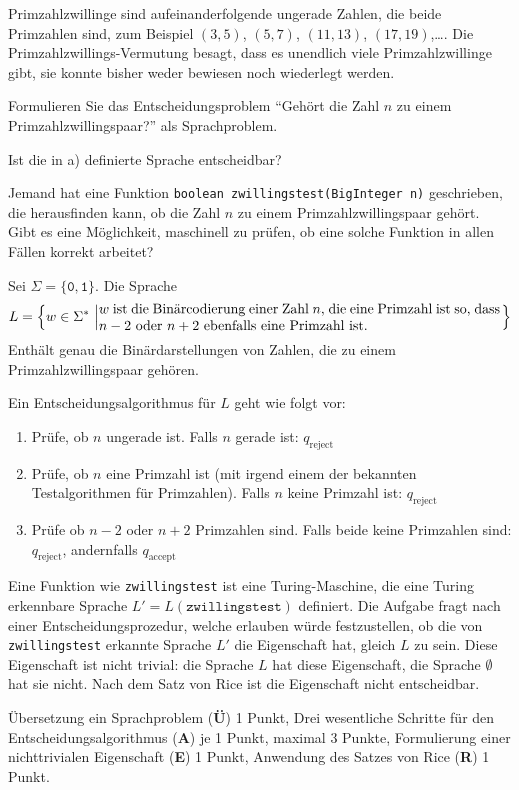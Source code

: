 Primzahlzwillinge sind aufeinanderfolgende ungerade Zahlen, die beide
Primzahlen sind, zum Beispiel $(3,5)$, $(5,7)$, $(11,13)$, $(17,19)$,\dots.
Die Primzahlzwillings-Vermutung besagt, dass es unendlich viele
Primzahlzwillinge gibt, sie konnte bisher weder bewiesen noch wiederlegt
werden.


\begin{teilaufgaben}
\item Formulieren Sie das Entscheidungsproblem ``Gehört die Zahl $n$ zu
einem Primzahlzwillingspaar?'' als Sprachproblem.
\item Ist die in a) definierte Sprache entscheidbar?
\item Jemand hat eine Funktion \texttt{boolean zwillingstest(BigInteger n)}
geschrieben, die herausfinden kann, ob die Zahl $n$ zu einem
Primzahlzwillingspaar gehört.
Gibt es eine Möglichkeit, maschinell zu prüfen, ob eine solche Funktion
in allen Fällen korrekt arbeitet?
\end{teilaufgaben}

\begin{loesung}
\begin{teilaufgaben}
\item Sei $\Sigma=\{\texttt{0},\texttt{1}\}$. Die Sprache
\[
L=\left\{w\in\Sigma^*\,\left|
\begin{minipage}{4truein}
$w$ ist die Binärcodierung einer Zahl $n$, die eine Primzahl ist
so, dass $n-2$ oder $n+2$ ebenfalls eine Primzahl ist.
\end{minipage}
\right.
\right\}
\]
Enthält genau die Binärdarstellungen von Zahlen, die zu einem
Primzahlzwillingspaar gehören.
\item
Ein Entscheidungsalgorithmus für $L$ geht wie folgt vor:
\begin{enumerate}
\item Prüfe, ob $n$ ungerade ist. Falls $n$ gerade ist: $q_\text{reject}$
\item Prüfe, ob $n$ eine Primzahl ist (mit irgend einem der bekannten
Testalgorithmen für Primzahlen). Falls $n$ keine Primzahl ist:
$q_{\text{reject}}$
\item Prüfe ob $n-2$ oder $n+2$ Primzahlen sind. Falls beide keine
Primzahlen sind: $q_{\text{reject}}$, andernfalls $q_{\text{accept}}$
\end{enumerate}
\item
Eine Funktion wie \texttt{zwillingstest} ist eine Turing-Maschine, die
eine Turing erkennbare Sprache $L'=L(\texttt{zwillingstest})$ definiert.
Die Aufgabe fragt nach einer Entscheidungsprozedur, welche erlauben
würde festzustellen, ob die von \texttt{zwillingstest} erkannte
Sprache $L'$ die Eigenschaft hat, gleich $L$ zu sein. Diese
Eigenschaft ist nicht trivial: die Sprache $L$ hat diese Eigenschaft,
die Sprache $\emptyset$ hat sie nicht. Nach dem Satz von Rice ist
die Eigenschaft nicht entscheidbar.
\qedhere
\end{teilaufgaben}
\end{loesung}

\begin{bewertung}
Übersetzung ein Sprachproblem ({\bf Ü}) 1 Punkt,
Drei wesentliche Schritte für den Entscheidungsalgorithmus ({\bf A})
je 1 Punkt, maximal 3 Punkte,
Formulierung einer nichttrivialen Eigenschaft ({\bf E}) 1 Punkt,
Anwendung des Satzes von Rice ({\bf R}) 1 Punkt.
\end{bewertung}

